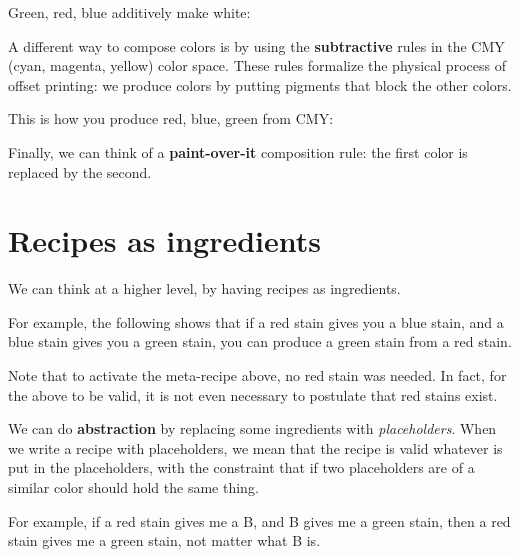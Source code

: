 Green, red, blue additively make white:


A different way to compose colors is by using the \textbf{subtractive} rules in the CMY (cyan, magenta, yellow) color space.
These rules formalize the physical process of offset printing: we produce colors by putting pigments that block the other colors.


This is how you produce red, blue, green from CMY:


Finally, we can think of a \textbf{paint-over-it} composition rule: the first color is replaced by the second.


\section{Recipes as ingredients}

We can think at a higher level, by having recipes as ingredients.


For example, the following shows that if a red stain gives you a blue stain, and a blue stain gives you a green stain, you can produce a green stain from a red stain.


Note that to activate the meta-recipe above, no red stain was needed.
In fact, for the above to be valid, it is not even necessary to postulate that red stains exist.

We can do \textbf{abstraction} by replacing some ingredients with \emph{placeholders}.
When we write a recipe with placeholders, we mean that the recipe is valid whatever is put in the placeholders, with the constraint that if two placeholders are of a similar color should hold the same thing.

For example, if a red stain gives me a B, and B gives me a green stain, then a red stain gives me a green stain, not matter what B is.


